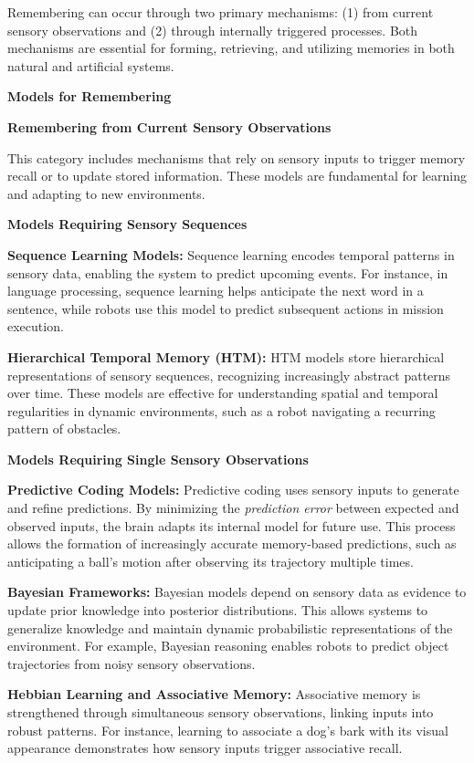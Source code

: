 \documentclass{book}
\providecommand{\ProjectDeepHeading}[2]{%
    \par\medskip\noindent\textbf{#2}\par\smallskip
}
\begin{document}
    Remembering can occur through two primary mechanisms: (1) from current sensory observations and (2) through internally triggered processes. Both mechanisms are essential for forming, retrieving, and utilizing memories in both natural and artificial systems.

\ProjectDeepHeading{5}{Models for Remembering}

    \ProjectDeepHeading{6}{Remembering from Current Sensory Observations}
    This category includes mechanisms that rely on sensory inputs to trigger memory recall or to update stored information. These models are fundamental for learning and adapting to new environments.

        \ProjectDeepHeading{7}{Models Requiring Sensory Sequences}
            \textbf{Sequence Learning Models:} Sequence learning encodes temporal patterns in sensory data, enabling the system to predict upcoming events. For instance, in language processing, sequence learning helps anticipate the next word in a sentence, while robots use this model to predict subsequent actions in mission execution.

            \textbf{Hierarchical Temporal Memory (HTM):} HTM models store hierarchical representations of sensory sequences, recognizing increasingly abstract patterns over time. These models are effective for understanding spatial and temporal regularities in dynamic environments, such as a robot navigating a recurring pattern of obstacles. 

        \ProjectDeepHeading{7}{Models Requiring Single Sensory Observations}
            \textbf{Predictive Coding Models:} Predictive coding uses sensory inputs to generate and refine predictions. By minimizing the \textit{prediction error} between expected and observed inputs, the brain adapts its internal model for future use. This process allows the formation of increasingly accurate memory-based predictions, such as anticipating a ball’s motion after observing its trajectory multiple times. 

            \textbf{Bayesian Frameworks:} Bayesian models depend on sensory data as evidence to update prior knowledge into posterior distributions. This allows systems to generalize knowledge and maintain dynamic probabilistic representations of the environment. For example, Bayesian reasoning enables robots to predict object trajectories from noisy sensory observations. 

            \textbf{Hebbian Learning and Associative Memory:} Associative memory is strengthened through simultaneous sensory observations, linking inputs into robust patterns. For instance, learning to associate a dog’s bark with its visual appearance demonstrates how sensory inputs trigger associative recall. 
\end{document}
